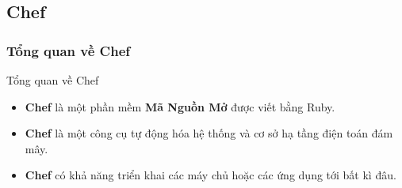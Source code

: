 \documentclass[14pt]{beamer}
\begin{document}
\subsection{Chef}
\subsubsection*{Tổng quan về Chef}

\begin{frame}{Tổng quan về Chef}
\renewcommand{\baselinestretch}{1.50}\normalsize
  \begin{itemize}
    \item \textbf{Chef} là một phần mềm \textbf{Mã Nguồn Mở} được viết bằng Ruby.
    \pause
    \item \textbf{Chef} là một công cụ tự động hóa hệ thống và cơ sở hạ tầng điện toán đám mây.
    \pause
    \item \textbf{Chef} có khả năng triển khai các máy chủ hoặc các ứng dụng tới bất kì đâu.
  \end{itemize}
\renewcommand{\baselinestretch}{1.0}\normalsize
\end{frame}
\end{document}
